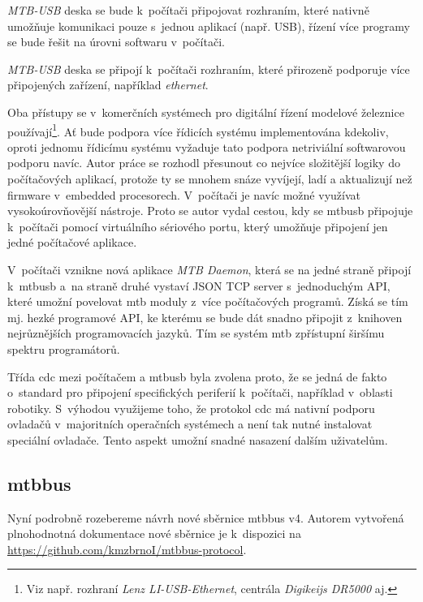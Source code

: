 \begin{compactenum}
\item \textit{MTB-USB} deska se bude k~počítači připojovat rozhraním, které
	nativně umožňuje komunikaci pouze s~jednou aplikací (např. USB), řízení více
	programy se bude řešit na úrovni softwaru v~počítači.
\item \textit{MTB-USB} deska se připojí k~počítači rozhraním, které přirozeně
	podporuje více připojených zařízení, například \textit{ethernet}.
\end{compactenum}

Oba přístupy se v~komerčních systémech pro digitální řízení modelové železnice
používají\footnote{Viz např. rozhraní \textit{Lenz LI-USB-Ethernet}, centrála
\textit{Digikeijs DR5000} aj.}.
Ať bude podpora více řídicích systému implementována kdekoliv, oproti jednomu
řídicímu systému vyžaduje tato podpora netriviální softwarovou podporu navíc.
Autor práce se rozhodl přesunout co nejvíce složitější logiky do počítačových
aplikací, protože ty se mnohem snáze vyvíjejí, ladí a aktualizují než
firmware v~embedded procesorech. V~počítači je navíc možné využívat
vysokoúrovňovější nástroje. Proto se autor vydal cestou, kdy se
\gls{mtbusb} připojuje k~počítači pomocí virtuálního sériového portu, který
umožňuje připojení jen jedné počítačové aplikace.

V~počítači vznikne nová aplikace \textit{MTB Daemon}, která se na jedné
straně připojí k~\gls{mtbusb} a~na straně druhé vystaví JSON TCP
server s~jednoduchým API, které umožní povelovat \gls{mtb} moduly z~více
počítačových programů. Získá se tím mj. hezké programové API, ke kterému
se bude dát snadno připojit z~knihoven nejrůznějších programovacích jazyků.
Tím se systém \gls{mtb} zpřístupní širšímu spektru programátorů.

Třída \gls{cdc} mezi počítačem a \gls{mtbusb} byla zvolena proto, že se jedná
de fakto o~standard pro připojení specifických periferií k~počítači, například
v~oblasti robotiky. S~výhodou využijeme toho, že protokol \gls{cdc} má nativní
podporu ovladačů v~majoritních operačních systémech a není tak nutné instalovat
speciální ovladače. Tento aspekt umožní snadné nasazení dalším uživatelům.

\subsection{\gls{mtbbus}}

Nyní podrobně rozebereme návrh nové sběrnice \gls{mtbbus} v4. Autorem vytvořená
plnohodnotná dokumentace nové sběrnice je k~dispozici na
\url{https://github.com/kmzbrnoI/mtbbus-protocol}.

